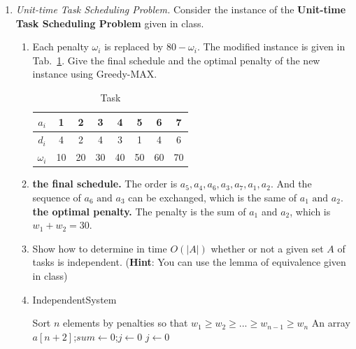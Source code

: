 \documentclass[12pt,a4paper]{article}
\makeatletter
\newtheorem*{solution}{Solution}
\theoremstyle{definition}
\renewenvironment{solution}[1][Solution] {\par\pushQED{\qed}\normalfont\topsep6\p@\@plus6\p@\relax\trivlist\item[\hskip\labelsep\bfseries#1\@addpunct{.}]\ignorespaces}{\popQED\endtrivlist\@endpefalse} \makeatother
\makeatother
\begin{document}
\begin{enumerate}
\begin{enumerate}
\end{enumerate}
\item \textit{Unit-time Task Scheduling Problem.} Consider the instance of the \textbf{Unit-time Task Scheduling Problem} given in class. 
    \begin{enumerate}
        \item Each penalty $\omega_{i}$ is replaced by $80-\omega_{i}$. The modified instance is given in Tab.~\ref{tab:1}. Give the final schedule and the optimal penalty of the new instance using Greedy-MAX.
		\begin{table}[H]
			\setlength{\abovecaptionskip}{0.cm}
			\setlength{\belowcaptionskip}{0.5cm}
			\centering
			\caption{Task}
			\label{tab:1}			
			\begin{tabular}{|c|ccccccc|}
				\hline
				$ a_{i} $&1&2&3&4&5&6&7\\
				\hline
				$ d_{i} $&4&2&4&3&1&4&6\\
                \hline
                $ \omega_{i} $&10&20&30&40&50&60&70\\
				\hline
			\end{tabular}
		\end{table}
	        \begin{solution}
	            \textbf{the final schedule.} The order is $a_5,a_4,a_6,a_3,a_7,a_1,a_2$. And the sequence of $a_6 \text{ and } a_3$ can be exchanged, which is the same of $a_1 \text{ and } a_2$.
				\\\textbf{the optimal penalty.} The penalty is the sum of $a_1$ and $a_2$, which is $w_1+w_2=30.$
	        \end{solution}
        \item Show how to determine in time $O(|A|)$ whether or not a given set $A$ of tasks is independent. (\textbf{Hint}: You can use the lemma of equivalence given in class)
 	        \begin{solution}
                \begin{algorithm}[H]
					
					\BlankLine
					\caption{IndependentSystem}\label{Alg-system}
		
					Sort $n$ elements by penalties so that $w_1\geqslant w_2\geqslant ...\geqslant w_{n-1}\geqslant w_n$\;
					An array $a[n+2]$;$sum\leftarrow 0$;$j\leftarrow 0$\;
					$j\leftarrow 0$\;


\end{algorithm}
\end{solution}
\end{enumerate}
\end{enumerate}
\end{document}
